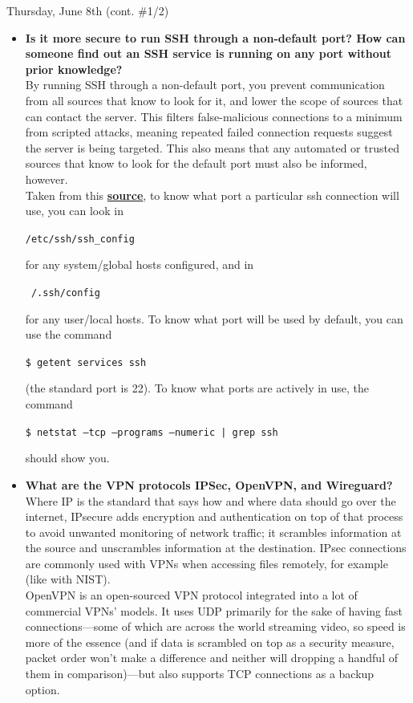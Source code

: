 \documentclass[11pt]{article}
\newcommand\codebox[1]{
    \noindent\hspace{-0.25em}\begin{tcolorbox}[on line, hbox, colback = codeblack, colframe = codeborder, coltext = white, boxrule = 1.5pt, left = 2pt, right = 2pt, top = 0.5pt, bottom = 0.5pt]
    \small\texttt{#1}\normalsize
    \end{tcolorbox}\hspace{-0.25em}
}
\begin{document}
\begin{orangebox}{Thursday, June 8th \hspace{0.2cm}(cont. \#1/2)\vspace{-2.2em}\begin{flushright}\end{flushright}}
    \begin{itemize}
        \item\textbf{Is it more secure to run SSH through a non-default port? How can someone find out an SSH service is running on any port without prior knowledge?} \\
        \phantom{~~~~} By running SSH through a non-default port, you prevent communication from all sources that know to look for it, and lower the scope of sources that can contact the server. This filters false-malicious connections to a minimum from scripted attacks, meaning repeated failed connection requests suggest the server is being targeted. This also means that any automated or trusted sources that know to look for the default port must also be informed, however. \\
        \phantom{~~~~} Taken from this \href{https://unix.stackexchange.com/questions/539882/find-which-port-does-ssh-client-used-to-send-connection-request}{\textbf{source}}, to know what port a particular ssh connection will use, you can look in \codebox{/etc/ssh/ssh\_config} for any system/global hosts configured, and in \codebox{~/.ssh/config} for any user/local hosts. To know what port will be used by default, you can use the command \codebox{\$ getent services ssh} (the standard port is 22). To know what ports are actively in use, the command \codebox{\$ netstat --tcp --programs --numeric | grep ssh} should show you.
        \item\textbf{What are the VPN protocols IPSec, OpenVPN, and Wireguard?} \\
        \phantom{~~~~} Where IP is the standard that says how and where data should go over the internet, IPsecure adds encryption and authentication on top of that process to avoid unwanted monitoring of network traffic; it scrambles information at the source and unscrambles information at the destination. IPsec connections are commonly used with VPNs when accessing files remotely, for example (like with NIST). \\
        \phantom{~~~~} OpenVPN is an open-sourced VPN protocol integrated into a lot of commercial VPNs' models. It uses UDP primarily for the sake of having fast connections---some of which are across the world streaming video, so speed is more of the essence (and if data is scrambled on top as a security measure, packet order won't make a difference and neither will dropping a handful of them in comparison)---but also supports TCP connections as a backup option. \\

\end{itemize}
\end{orangebox}
\end{document}
